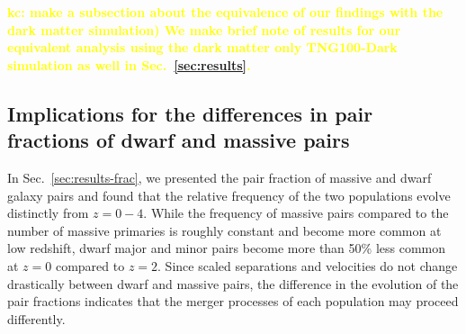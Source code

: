 \documentclass[twocolumn]{aastex631}
\newcommand{\kc}[1]{\textcolor{yellow}{\textbf{kc: #1}} }
\begin{document}
    
    \kc{ make a subsection about the equivalence of our findings with the dark matter simulation) We make brief note of results for our equivalent analysis using the dark matter only TNG100-Dark simulation as well in Sec.~\ref{sec:results}.}

\subsection{Implications for the differences in pair fractions of dwarf and massive pairs}
In Sec.~\ref{sec:results-frac}, we presented the pair fraction of massive and dwarf galaxy pairs and found that the relative frequency of the two populations evolve distinctly from $z=0-4$. 
While the frequency of massive pairs compared to the number of massive primaries is roughly constant and become more common at low redshift, dwarf major and minor pairs become more than 50\% less common at $z=0$ compared to $z=2$. 
Since scaled separations and velocities do not change drastically between dwarf and massive pairs, the difference in the evolution of the pair fractions indicates that the merger processes of each population may proceed differently.


\end{document}
